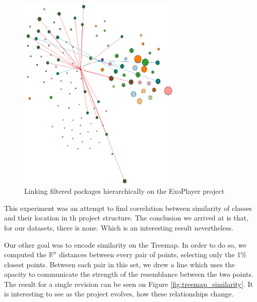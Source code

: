 \begin{figure}[H]
	\centering
	\includegraphics[width=0.7\textwidth]{figures/hier_two_sim_graph.png}
	\caption{Linking filtered packages hierarchically on the ExoPlayer project}
	\label{fig:hier_two_sim_graph}
\end{figure}

This experiment was an attempt to find correlation between similarity of classes and their location in th project structure. The conclusion we arrived at is that, for our datasets, there is none. Which is an interesting result nevertheless.

Our other goal was to encode similarity on the Treemap. In order to do so, we computed the $\mathbb{R}^{n}$ distances between every pair of points, selecting only the 1\% closest points. Between each pair in this set, we drew a line which uses the opacity to communicate the strength of the resemblance between the two points. The result for a single revision can be seen on Figure \ref{fig:treemap_similarity}. It is interesting to see as the project evolves, how these relationships change.


